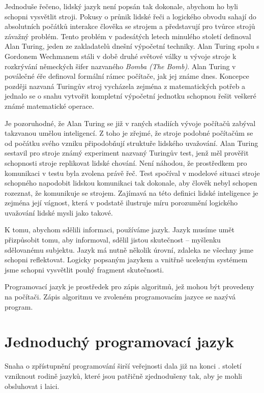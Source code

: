 \documentclass[10pt,twoside=true,open=right,cleardoublepage=empty,chapterprefix=true]{scrbook}
\newcommand{\oddil}[1]{\section{#1}\index{#1}\label{#1}}
\newcommand{\lnb}{\linebreak}
\begin{document}
\pagebreak

Jednoduše řečeno, lidský jazyk není popsán tak dokonale, abychom ho byli schopni vysvětlit stroji. Pokusy o průnik lidské řeči a logického \lnb obvodu sahají do absolutních počátků interakce člověka se strojem a představují pro tvůrce strojů závažný problém. Tento problém v padesátých letech minulého století definoval Alan Turing, jeden ze zakladatelů dnešní výpočetní techniky. Alan Turing spolu s Gordonem Wechmanem stáli v době druhé světové války u vývoje stroje k rozkrývání německých šifer nazvaného {\em Bomba (The Bomb)}. Alan Turing v poválečné éře definoval formální rámec počítače, jak jej známe dnes. Koncepce později nazvaná Turingův stroj vycházela zejména z matematických potřeb a jednalo se o snahu vytvořit kompletní výpočetní jednotku schopnou řešit veškeré známé matematické operace.  


Je pozoruhodné, že Alan Turing se již v raných stadiích vývoje počítačů zabýval takzvanou umělou inteligencí. Z toho je zřejmé, že stroje podobné počítačům se od počátku svého vzniku připodobňují struktuře lidského uvažování. Alan Turing sestavil pro stroje známý experiment nazvaný Turingův test, jenž měl prověřit schopnosti stroje replikovat lidské chování. Není náhodou, že prostředkem pro komunikaci v testu byla zvolena právě řeč. Test spočíval v modelové situaci stroje schopného napodobit lidskou komunikaci tak dokonale, aby člověk nebyl schopen rozeznat, že komunikuje se strojem. Zajímavá na této definici lidské inteligence je zejména její vágnost, která v podstatě ilustruje míru porozumění logického uvažování lidské mysli jako takové.

K tomu, abychom sdělili informaci, používáme jazyk. Jazyk musíme umět přizpůsobit tomu, aby informoval, sdělil jistou skutečnost -- myšlenku sdělovanému subjektu. Jazyk má nutně několik úrovní, zdaleka ne všechny jsme schopni reflektovat. Logicky popsaným jazykem a vnitřně uceleným systémem jsme schopni vysvětlit pouhý fragment skutečnosti.

Programovací jazyk je prostředek pro zápis algoritmů, jež mohou být provedeny na počítači. Zápis algoritmu ve zvoleném programovacím \lnb jazyce se nazývá program.





\oddil{Jednoduchý programovací jazyk}

Snaha o zpřístupnění programování širší veřejnosti dala již na konci \lnb 20. století vzniknout rodině jazyků, které jsou patřičně zjednodušeny tak, aby je mohli obsluhovat i laici.
\end{document}
